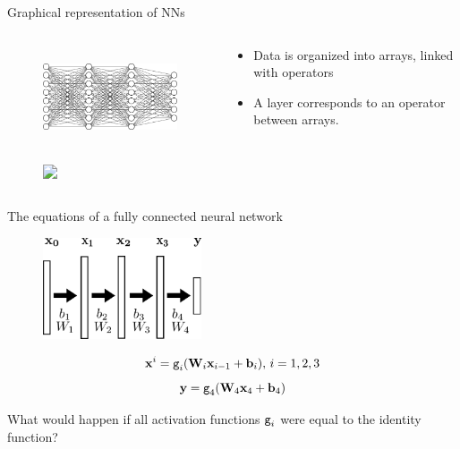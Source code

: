 \documentclass[xcolor=pdftex,dvipsnames,table,mathserif]{beamer}
\begin{document}
\begin{frame}{Graphical representation of NNs}

  \begin{columns}
    \begin{column}{.5\textwidth}
      \begin{figure}
        \includegraphics[height=3cm]{mini_reseau3_bis}
      \end{figure}
      \begin{figure}
        \includegraphics<2->[height=3cm]{nn_representation3}
      \end{figure}
    \end{column}

    \begin{column}{.5\textwidth}
      \begin{itemize}
      \item<2-> Data is organized into arrays, linked with operators
      \item<3-> A layer corresponds to an operator between arrays.
      \end{itemize}
    \end{column}
  \end{columns}

\end{frame}

\begin{frame}{The equations of a fully connected neural network}

  \begin{figure}
    \includegraphics[height=3cm]{nn_representation2}
  \end{figure}

  \begin{block}{}
    \[\mathbf{x}^i = \texttt{g}_i(\mathbf{W}_i\mathbf{x}_{i-1} + \mathbf{b}_i),\, i= 1, 2, 3 \]
    \[\mathbf{y} = \texttt{g}_4(\mathbf{W}_4\mathbf{x}_4 + \mathbf{b}_4)\]
  \end{block}

  \pause

  What would happen if all activation functions $\texttt{g}_i$ were equal to the identity function?

\end{frame}
\end{document}
